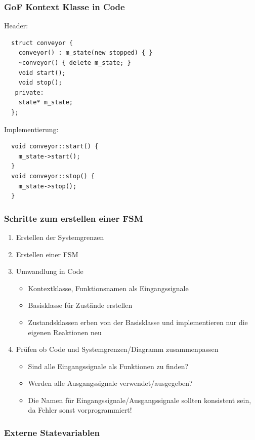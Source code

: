 \documentclass{beamer}
\begin{document}
\begin{frame}[fragile]
 \frametitle{GoF Kontext Klasse in Code}
 Header:
 \begin{lstlisting}
  struct conveyor {
    conveyor() : m_state(new stopped) { }
    ~conveyor() { delete m_state; }
    void start();
    void stop();
   private:
    state* m_state;
  };
 \end{lstlisting}
 Implementierung:
 \begin{lstlisting}
  void conveyor::start() {
    m_state->start();
  }
  void conveyor::stop() {
    m_state->stop();
  }
 \end{lstlisting}
\end{frame}

\begin{frame}
 \frametitle{Schritte zum erstellen einer FSM}
 \begin{enumerate}
  \item Erstellen der Systemgrenzen
  \item Erstellen einer FSM
  \item Umwandlung in Code
  \begin{itemize}
   \item Kontextklasse, Funktionsnamen als Eingangssignale
   \item Basisklasse für Zustände erstellen
   \item Zustandsklassen erben von der Basisklasse und implementieren nur die eigenen Reaktionen neu
  \end{itemize}
  \item Pr\"ufen ob Code und Systemgrenzen/Diagramm zusammenpassen
  \begin{itemize}
   \item Sind alle Eingangssignale als Funktionen zu finden?
   \item Werden alle Ausgangssignale verwendet/ausgegeben?
   \item Die Namen f\"ur Eingangssignale/Ausgangssignale sollten konsistent sein, da Fehler sonst vorprogrammiert!
  \end{itemize}
 \end{enumerate}
\end{frame}

\begin{frame}
 \frametitle{Externe Statevariablen}
\end{frame}
\end{document}
